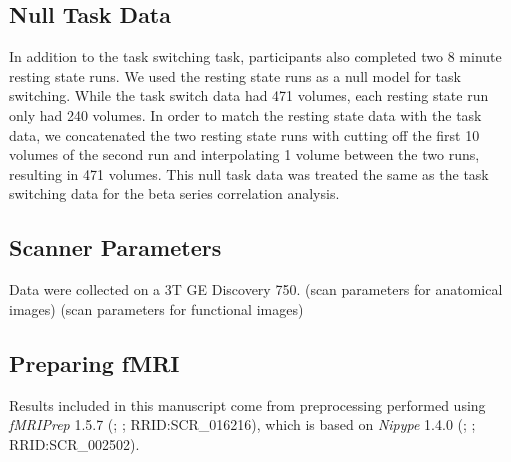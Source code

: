 \documentclass[10pt,letterpaper]{article}
\begin{document}
\subsection*{Null Task Data}
In addition to the task switching task, participants also completed
two 8 minute resting state runs.
We used the resting state runs as a null model for task switching.
While the task switch data had 471 volumes, each resting state run only had
240 volumes.
In order to match the resting state data with the task data, we concatenated
the two resting state runs with cutting off the first 10 volumes of the second run
and interpolating 1 volume between the two runs, resulting in 471 volumes.
This null task data was treated the same as the task switching data for the
beta series correlation analysis.

\subsection{Scanner Parameters}
Data were collected on a 3T GE Discovery 750.
(scan parameters for anatomical images)
(scan parameters for functional images)


\subsection{Preparing fMRI}
Results included in this manuscript come from preprocessing performed
using \emph{fMRIPrep} 1.5.7 (\cite{fmriprep1}; \cite{fmriprep2}; RRID:SCR\_016216),
which is based on \emph{Nipype} 1.4.0
(\cite{nipype1}; \cite{nipype2}; RRID:SCR\_002502).
\end{document}
